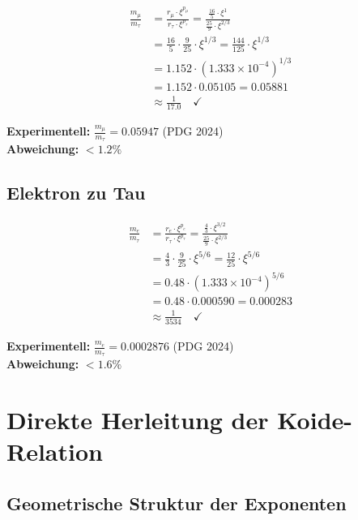 	\begin{beweis}
		\begin{align}
			\frac{m_\mu}{m_\tau} &= \frac{r_\mu \cdot \xi^{p_\mu}}{r_\tau \cdot \xi^{p_\tau}} = \frac{\frac{16}{5} \cdot \xi^1}{\frac{25}{9} \cdot \xi^{2/3}} \\
			&= \frac{16}{5} \cdot \frac{9}{25} \cdot \xi^{1/3} = \frac{144}{125} \cdot \xi^{1/3} \\
			&= 1.152 \cdot (1.333 \times 10^{-4})^{1/3} \\
			&= 1.152 \cdot 0.05105 = 0.05881 \\
			&\approx \frac{1}{17.0} \quad \checkmark
		\end{align}
		
		\textbf{Experimentell:} $\frac{m_\mu}{m_\tau} = 0.05947$ (PDG 2024)\\
		\textbf{Abweichung:} $< 1.2\%$
	\end{beweis}
	
	\subsection{Elektron zu Tau}
	
	\begin{beweis}
		\begin{align}
			\frac{m_e}{m_\tau} &= \frac{r_e \cdot \xi^{p_e}}{r_\tau \cdot \xi^{p_\tau}} = \frac{\frac{4}{3} \cdot \xi^{3/2}}{\frac{25}{9} \cdot \xi^{2/3}} \\
			&= \frac{4}{3} \cdot \frac{9}{25} \cdot \xi^{5/6} = \frac{12}{25} \cdot \xi^{5/6} \\
			&= 0.48 \cdot (1.333 \times 10^{-4})^{5/6} \\
			&= 0.48 \cdot 0.000590 = 0.000283 \\
			&\approx \frac{1}{3534} \quad \checkmark
		\end{align}
		
		\textbf{Experimentell:} $\frac{m_e}{m_\tau} = 0.0002876$ (PDG 2024)\\
		\textbf{Abweichung:} $< 1.6\%$
	\end{beweis}
	
	\section{Direkte Herleitung der Koide-Relation}
	
	\subsection{Geometrische Struktur der Exponenten}
	
